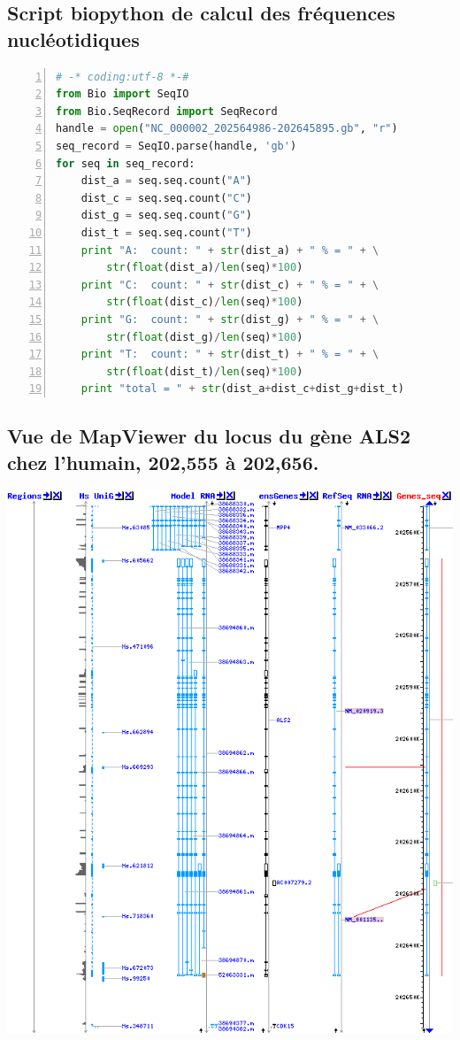 \documentclass[10.8pt]{article} %
\begin{document}
\subsection{Script biopython de calcul des fréquences nucléotidiques}\label{3}
\begin{lstlisting}[frame=single,numbers=left,language=Python]
# -* coding:utf-8 *-#
from Bio import SeqIO
from Bio.SeqRecord import SeqRecord
handle = open("NC_000002_202564986-202645895.gb", "r")
seq_record = SeqIO.parse(handle, 'gb')
for seq in seq_record:
    dist_a = seq.seq.count("A")
    dist_c = seq.seq.count("C")
    dist_g = seq.seq.count("G")
    dist_t = seq.seq.count("T")
    print "A:  count: " + str(dist_a) + " % = " + \
        str(float(dist_a)/len(seq)*100)
    print "C:  count: " + str(dist_c) + " % = " + \
        str(float(dist_c)/len(seq)*100)
    print "G:  count: " + str(dist_g) + " % = " + \
        str(float(dist_g)/len(seq)*100)
    print "T:  count: " + str(dist_t) + " % = " + \
        str(float(dist_t)/len(seq)*100)
    print "total = " + str(dist_a+dist_c+dist_g+dist_t)
\end{lstlisting}

\subsection{Vue de MapViewer du locus du gène ALS2 chez l'humain, 202,555 à 202,656.}\label{4}
\includegraphics[width=\linewidth]{annexes/annexe1b_mapviewer_202555-202656.png}
\end{document}
